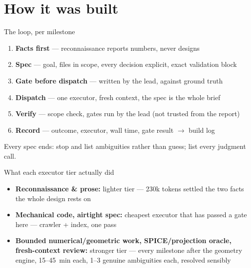 \documentclass[aspectratio=169,11pt]{beamer}
\newcommand{\currevsec}{}
\newcommand{\revsec}[1]{\gdef\currevsec{#1}}
\begin{document}
\section{How it was built}

\begin{frame}{The loop, per milestone}
  \revsec{6}
  \begin{enumerate}
    \item \textbf{Facts first} --- reconnaissance reports numbers, never designs
    \item \textbf{Spec} --- goal, files in scope, every decision explicit, exact validation block
    \item \textbf{Gate before dispatch} --- written by the lead, against ground truth
    \item \textbf{Dispatch} --- one executor, fresh context, the spec is the whole brief
    \item \textbf{Verify} --- scope check, gates run by the lead (not trusted from the report)
    \item \textbf{Record} --- outcome, executor, wall time, gate result $\to$ build log
  \end{enumerate}
  Every spec ends: stop and list ambiguities rather than guess; list every judgment call.
\end{frame}

\begin{frame}{What each executor tier actually did}
  \revsec{6}
  \small
  \begin{itemize}
    \item \textbf{Reconnaissance \& prose:} lighter tier --- 230k tokens settled the two facts the whole design rests on
    \item \textbf{Mechanical code, airtight spec:} cheapest executor that has passed a gate here --- crawler + index, one pass
    \item \textbf{Bounded numerical/geometric work, SPICE/projection oracle, fresh-context review:} stronger tier --- every milestone after the geometry engine, 15--45~min each, 1--3 genuine ambiguities each, resolved sensibly
  \end{itemize}
\end{frame}
\end{document}
